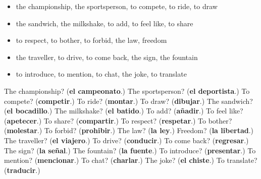 \begin{itemize}
\raggedright
  \item the championship, the sportsperson, to compete, to ride, to draw
  \item the sandwich, the milkshake, to add, to feel like, to share
  \item to respect, to bother, to forbid, the law, freedom
  \item the traveller, to drive, to come back, the sign, the fountain
  \item to introduce, to mention, to chat, the joke, to translate
\end{itemize}

\begin{tcolorbox}[breakable,colback=teal!4,colframe=teal!35!black,title={Before you move on}]
The championship? (\textbf{el campeonato}.) The sportsperson? (\textbf{el deportista}.) To compete? (\textbf{competir}.) To ride? (\textbf{montar}.) To draw? (\textbf{dibujar}.) The sandwich? (\textbf{el bocadillo}.) The milkshake? (\textbf{el batido}.) To add? (\textbf{añadir}.) To feel like? (\textbf{apetecer}.) To share? (\textbf{compartir}.) To respect? (\textbf{respetar}.) To bother? (\textbf{molestar}.) To forbid? (\textbf{prohibir}.) The law? (\textbf{la ley}.) Freedom? (\textbf{la libertad}.) The traveller? (\textbf{el viajero}.) To drive? (\textbf{conducir}.) To come back? (\textbf{regresar}.) The sign? (\textbf{la señal}.) The fountain? (\textbf{la fuente}.) To introduce? (\textbf{presentar}.) To mention? (\textbf{mencionar}.) To chat? (\textbf{charlar}.) The joke? (\textbf{el chiste}.) To translate? (\textbf{traducir}.)
\end{tcolorbox}
